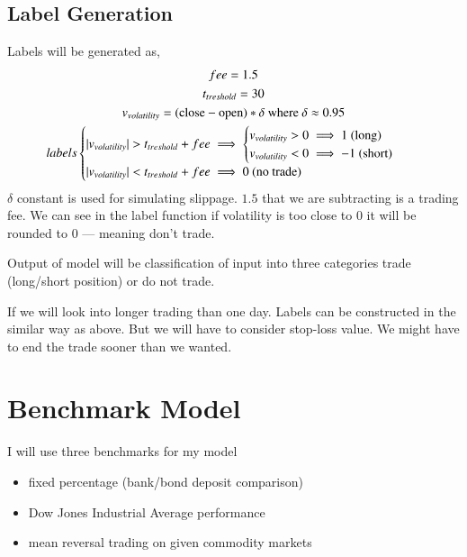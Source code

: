 \documentclass[final,2p]{elsarticle}
\begin{document}
\subsection{Label Generation}
Labels will be generated as,
\begin{gather}
    fee = 1.5 \\
    t_{treshold} = 30 \\
    v_{volatility} = (\textup{close} - \textup{open})*\delta \textup{ where } \delta \approx 0.95 \\
    labels
    \begin{cases}
        | v_{volatility} | > t_{treshold} + fee \implies
        \begin{cases}
            v_{volatility} > 0 \implies 1 \textup{ (long)} \\
            v_{volatility} < 0 \implies -1 \textup{ (short)} \\
        \end{cases}\\
        | v_{volatility} | < t_{treshold} + fee \implies 0 \textup{ (no trade)}
    \end{cases}
\end{gather}
$\delta$ constant is used for simulating slippage.
$1.5$ that we are subtracting is a trading fee.
We can see in the label function if volatility is too close to $0$ it will be rounded to $0$ --- meaning don't trade.

Output of model will be classification of input into three categories trade (long/short position) or do not trade.

If we will look into longer trading than one day. Labels can be constructed in the similar way as above. But we will have to consider stop-loss value. We might have to end the trade sooner than we wanted.

\section{Benchmark Model}

I will use three benchmarks for my model

\begin{itemize}
    \item fixed percentage (bank/bond deposit comparison)
    \item Dow Jones Industrial Average performance
    \item mean reversal trading on given commodity markets
\end{itemize}
\end{document}
